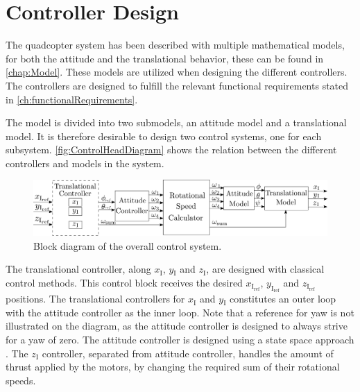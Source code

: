 \chapter{Controller Design}\label{chap:Control}
The quadcopter system has been described with multiple mathematical models, for both the attitude and the translational behavior, these can be found in \autoref{chap:Model}. These models are utilized when designing the different controllers. The controllers are designed to fulfill the relevant functional requirements stated in \autoref{ch:functionalRequirements}.

The model is divided into two submodels, an attitude model and a translational model. It is therefore desirable to design two control systems, one for each subsystem. \autoref{fig:ControlHeadDiagram} shows the relation between the different controllers and models in the system.

%
\begin{figure}[H]
	\centering
	\includegraphics[width=1 \textwidth]{figures/generalcontroldiagram2}
	\caption{Block diagram of the overall control system.}
	\label{fig:ControlHeadDiagram}
\end{figure}
%
The translational controller, along $x_{\mathrm{I}}$, $y\mathrm{_I}$ and $z\mathrm{_I}$, are designed with classical control methods. This control block receives the desired $x_\mathrm{I_{ref}}$, $y_\mathrm{I_{ref}}$ and $z_\mathrm{I_{ref}}$ positions. The translational controllers for $x\mathrm{_I}$ and $y\mathrm{_I}$ constitutes an outer loop with the attitude controller as the inner loop. Note that a reference for yaw is not illustrated on the diagram, as the attitude controller is designed to always strive for a yaw of zero. The attitude controller is designed using a state space approach \cite{ssReference}. The $z\mathrm{_I}$ controller, separated from attitude controller, handles the amount of thrust applied by the motors, by changing the required sum of their rotational speeds.

